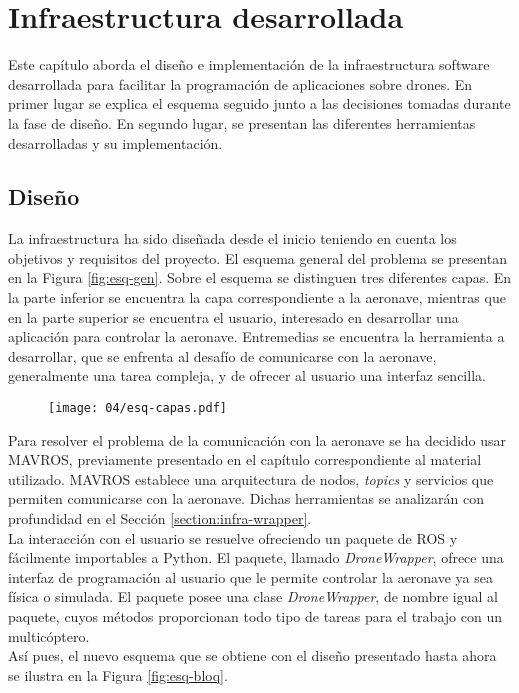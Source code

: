 \documentclass[../main.tex]{subfiles}
\begin{document}
\chapter{Infraestructura desarrollada} \label{cap:infra}
Este capítulo aborda el diseño e implementación de la infraestructura software desarrollada para facilitar la programación de aplicaciones sobre drones. En primer lugar se explica el esquema seguido junto a las decisiones tomadas durante la fase de diseño. En segundo lugar, se presentan las diferentes herramientas desarrolladas y su implementación.

\section{Diseño} \label{section:infra-disenho}
La infraestructura ha sido diseñada desde el inicio teniendo en cuenta los objetivos y requisitos del proyecto. El esquema general del problema se presentan en la Figura \ref{fig:esq-gen}. Sobre el esquema se distinguen tres diferentes capas. En la parte inferior se encuentra la capa correspondiente a la aeronave, mientras que en la parte superior se encuentra el usuario, interesado en desarrollar una aplicación para controlar la aeronave. Entremedias se encuentra la herramienta a desarrollar, que se enfrenta al desafío de comunicarse con la aeronave, generalmente una tarea compleja, y de ofrecer al usuario una interfaz sencilla.

\begin{figure}[!ht]
 	{\texttt{[image: 04/esq-capas.pdf]}}
\end{figure}

Para resolver el problema de la comunicación con la aeronave se ha decidido usar MAVROS, previamente presentado en el capítulo correspondiente al material utilizado. MAVROS establece una arquitectura de nodos, \emph{topics} y servicios que permiten comunicarse con la aeronave. Dichas herramientas se analizarán con profundidad en el Sección \ref{section:infra-wrapper}. \\
La interacción con el usuario se resuelve ofreciendo un paquete de ROS y fácilmente importables a Python. El paquete, llamado \emph{DroneWrapper}, ofrece una interfaz de programación al usuario que le permite controlar la aeronave ya sea física o simulada. El paquete posee una clase \emph{DroneWrapper}, de nombre igual al paquete, cuyos métodos proporcionan todo tipo de tareas para el trabajo con un multicóptero. \\
Así pues, el nuevo esquema que se obtiene con el diseño presentado hasta ahora se ilustra en la Figura \ref{fig:esq-bloq}.
\end{document}

